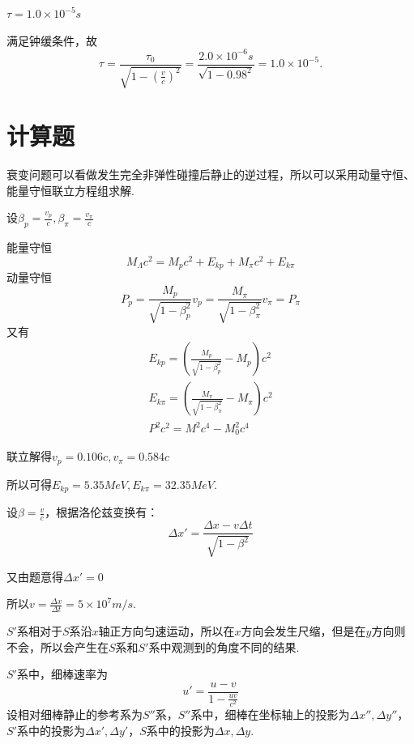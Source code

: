 \documentclass[b5paper,opensource,sourcefont,parskip]{qyxf-book}
\begin{document}
$\tau=1.0\times10^{-5}s$

\solve
满足钟缓条件，故
\begin{equation*}
\tau=\frac{\tau_0}{\sqrt{1-(\frac{v}{c})^2}}=\frac{2.0\times10^{-6}s}{\sqrt{1-0.98^2}}=1.0\times10^{-5}.
\end{equation*}


\section{计算题}

\analysis
衰变问题可以看做发生完全非弹性碰撞后静止的逆过程，所以可以采用动量守恒、能量守恒联立方程组求解.

\solve 
设$\beta_p=\frac{v_p}{c},\beta_\pi=\frac{v_\pi}{c}$

能量守恒
\begin{equation*}
M_\Lambda c^2=M_pc^2+E_{kp}+M_\pi c^2+E_{k\pi}
\end{equation*}
动量守恒
\begin{equation*}
P_p=\frac{M_p}{\sqrt{1-\beta_p^2}}v_p=\frac{M_\pi}{\sqrt{1-\beta_\pi^2}}v_\pi=P_\pi
\end{equation*}
又有
\begin{align*}
E_{kp}=(\frac{M_p}{\sqrt{1-\beta_p^2}}-M_p)c^2\\
E_{k\pi}=(\frac{M_\pi}{\sqrt{1-\beta_\pi^2}}-M_\pi)c^2\\
P^2c^2=M^2c^4-M_0^2c^4
\end{align*}

联立解得$v_p=0.106c,v_\pi=0.584c$

所以可得$E_{kp}=5.35MeV,E_{k\pi}=32.35MeV$.


\solve 
设$\beta=\frac{v}{c}$，根据洛伦兹变换有：
\begin{equation*}
\Delta x'=\frac{\Delta x-v\Delta t}{\sqrt{1-\beta^2}}
\end{equation*}

又由题意得$\Delta x'=0$

所以$v=\frac{\Delta x}{\Delta t}=5\times10^7m/s$.


\analysis
$S'$系相对于$S$系沿$x$轴正方向匀速运动，所以在$x$方向会发生尺缩，但是在$y$方向则不会，所以会产生在$S$系和$S'$系中观测到的角度不同的结果.

\solve
$S'$系中，细棒速率为
\begin{equation*}
u'=\frac{u-v}{1-\frac{uv}{c^2}}
\end{equation*}
设相对细棒静止的参考系为$S''$系，$S''$系中，细棒在坐标轴上的投影为$\Delta x'',\Delta y''$，$S'$系中的投影为$\Delta x',\Delta y'$，$S$系中的投影为$\Delta x,\Delta y$.
\end{document}
